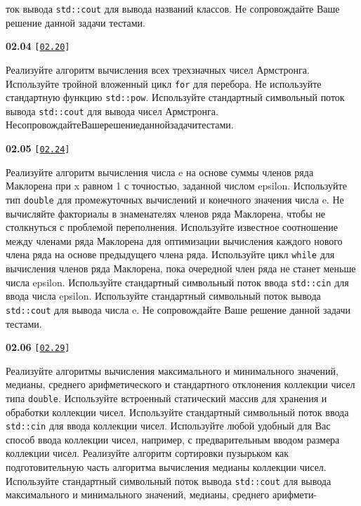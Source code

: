 \documentclass[a4paper,12pt]{article}
\begin{document}
ток вывода \lstinline{std::cout} для вывода названий классов. Не сопровождайте Ваше решение данной задачи тестами.

\bigskip

{\large \textbf{02.04} \texttt{[\href{https://github.com/i-s-m-mipt/Education/blob/master/projects/examples/source/02.20.cpp}{\texttt{02.20}}]}}

\bigskip

Реализуйте алгоритм вычисления всех трехзначных чисел Армстронга. Используйте тройной вложенный цикл \lstinline{for} для перебора. Не используйте стандартную функцию \lstinline{std::pow}. Используйте стандартный символьный поток вывода \lstinline{std::cout} для вывода чисел Армстронга. Не\:сопровождайте\:Ваше\:решение\:данной\:задачи\:тестами.

\bigskip

{\large \textbf{02.05} \texttt{[\href{https://github.com/i-s-m-mipt/Education/blob/master/projects/examples/source/02.24.cpp}{\texttt{02.24}}]}}

\bigskip

Реализуйте алгоритм вычисления числа e на основе суммы членов ряда Маклорена при x равном 1 с точностью, заданной числом epsilon. Используйте тип \lstinline{double} для промежуточных вычислений и конечного значения числа e. Не вычисляйте факториалы в знаменателях членов ряда Маклорена, чтобы не столкнуться с проблемой переполнения. Используйте известное соотношение между членами ряда Маклорена для оптимизации вычисления каждого нового члена ряда на основе предыдущего члена ряда. Используйте цикл \lstinline{while} для вычисления членов ряда Маклорена, пока очередной член ряда не станет меньше числа epsilon. Используйте стандартный символьный поток ввода \lstinline{std::cin} для ввода числа epsilon. Используйте стандартный символьный поток вывода \lstinline{std::cout} для вывода числа e. Не сопровождайте Ваше решение данной задачи тестами.

\bigskip

{\large \textbf{02.06} \texttt{[\href{https://github.com/i-s-m-mipt/Education/blob/master/projects/examples/source/02.29.cpp}{\texttt{02.29}}]}}

\bigskip

Реализуйте алгоритмы вычисления максимального и минимального значений, медианы, среднего арифметического и стандартного отклонения коллекции чисел типа \lstinline{double}. Используйте встроенный статический массив для хранения и обработки коллекции чисел. Используйте стандартный символьный поток ввода \lstinline{std::cin} для ввода коллекции чисел. Используйте любой удобный для Вас способ ввода коллекции чисел, например, с предварительным вводом размера коллекции чисел. Реализуйте алгоритм сортировки пузырьком как подготовительную часть алгоритма вычисления медианы коллекции чисел. Используйте стандартный символьный поток вывода \lstinline{std::cout} для вывода максимального и минимального значений, медианы, среднего арифмети- 
\end{document}

